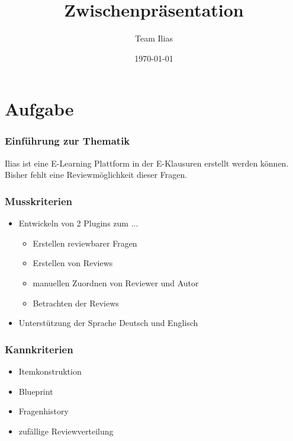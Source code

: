 \documentclass{beamer}
\title{Zwischenpräsentation}
\author{Team Ilias}
\date{\today}
\begin{document}
\maketitle
\frame{\tableofcontents[]}

 
\section{Aufgabe}
\begin{frame} %
  \frametitle{Einführung zur Thematik} %
  \begin{Überblick} %
    Ilias ist eine E-Learning Plattform in der E-Klausuren erstellt werden können.
    Bisher fehlt eine Reviewmöglichkeit dieser Fragen.
  \end{Überblick}
\end{frame}

\begin{frame} %
  \frametitle{Musskriterien} %
  \begin{Definition} %
    \begin{itemize}
    		\item Entwickeln von 2 Plugins zum ... 
    			\begin{itemize}
    				 \item Erstellen reviewbarer Fragen
    				 \item Erstellen von Reviews
    				 \item manuellen Zuordnen von Reviewer und Autor
    				 \item Betrachten der Reviews
			\end{itemize}    			
    		\item Unterstützung der Sprache Deutsch und Englisch
    \end{itemize}
  \end{Definition}
\end{frame}

\begin{frame} %
  \frametitle{Kannkriterien} %
  \begin{Definition} %
    \begin{itemize}
    		\item Itemkonstruktion
    		\item Blueprint
    		\item Fragenhistory
    		\item zufällige Reviewverteilung
    \end{itemize}
  \end{Definition}
\end{frame}
\end{document}
